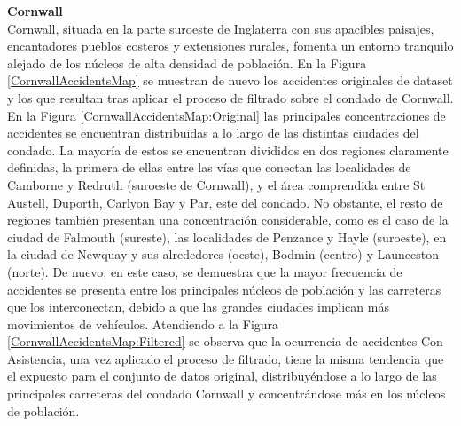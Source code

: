 \documentclass{uathesis-es}
\begin{document}
{		
		\textbf{Cornwall}\\
		
		Cornwall, situada en la parte suroeste de Inglaterra con sus apacibles paisajes, encantadores pueblos costeros y extensiones rurales, fomenta un entorno tranquilo alejado de los núcleos de alta densidad de población. En la Figura \ref{CornwallAccidentsMap} se muestran de nuevo los accidentes originales de dataset y los que resultan tras aplicar el proceso de filtrado sobre el condado de Cornwall. En la Figura \ref{CornwallAccidentsMap:Original} las principales concentraciones de accidentes se encuentran distribuidas a lo largo de las distintas ciudades del condado. La mayoría de estos se encuentran divididos en dos regiones claramente definidas, la primera de ellas entre las vías que conectan las localidades de Camborne y Redruth (suroeste de Cornwall), y el área comprendida entre St Austell, Duporth, Carlyon Bay y Par, este del condado. No obstante, el resto de regiones también presentan una concentración considerable, como es el caso de la ciudad de Falmouth (sureste), las localidades de Penzance y Hayle (suroeste), en la ciudad de Newquay y sus alrededores (oeste), Bodmin (centro) y Launceston (norte). De nuevo, en este caso, se demuestra que la mayor frecuencia de accidentes se presenta entre los principales núcleos de población y las carreteras que los interconectan, debido a que las grandes ciudades implican más movimientos de vehículos. Atendiendo a la Figura \ref{CornwallAccidentsMap:Filtered} se observa que la ocurrencia de accidentes Con Asistencia, una vez aplicado el proceso de filtrado, tiene la misma tendencia que el expuesto para el conjunto de datos original, distribuyéndose a lo largo de las principales carreteras del condado Cornwall y concentrándose más en los núcleos de población.
		
		
}
\end{document}
